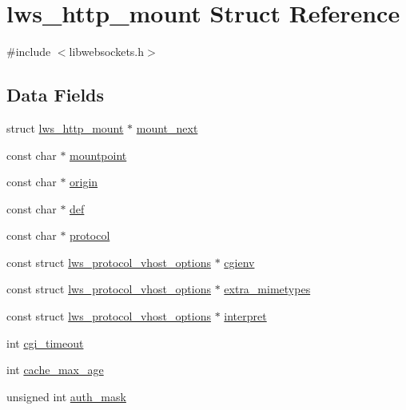 \hypertarget{structlws__http__mount}{}\section{lws\+\_\+http\+\_\+mount Struct Reference}
\label{structlws__http__mount}


{\ttfamily \#include $<$libwebsockets.\+h$>$}

\subsection*{Data Fields}
\begin{DoxyCompactItemize}
\item 
struct \hyperlink{structlws__http__mount}{lws\+\_\+http\+\_\+mount} $\ast$ \hyperlink{structlws__http__mount_ad878546ae1c399bbca7d7f8a0baf973d}{mount\+\_\+next}
\item 
const char $\ast$ \hyperlink{structlws__http__mount_aa2391bfcada0b7a290b3c6651f64586c}{mountpoint}
\item 
const char $\ast$ \hyperlink{structlws__http__mount_a21d86fd6043ec00e121ababbc29af39a}{origin}
\item 
const char $\ast$ \hyperlink{structlws__http__mount_ae90d1efe7178199fad39de2926902ee4}{def}
\item 
const char $\ast$ \hyperlink{structlws__http__mount_a05347d92c3d379809564bd4f3eab259b}{protocol}
\item 
const struct \hyperlink{structlws__protocol__vhost__options}{lws\+\_\+protocol\+\_\+vhost\+\_\+options} $\ast$ \hyperlink{structlws__http__mount_ae7b5c0f4c5408061e6ea3a8d281f45af}{cgienv}
\item 
const struct \hyperlink{structlws__protocol__vhost__options}{lws\+\_\+protocol\+\_\+vhost\+\_\+options} $\ast$ \hyperlink{structlws__http__mount_a4437423df85ee3dbcae0e15974c89ec7}{extra\+\_\+mimetypes}
\item 
const struct \hyperlink{structlws__protocol__vhost__options}{lws\+\_\+protocol\+\_\+vhost\+\_\+options} $\ast$ \hyperlink{structlws__http__mount_a11ea62b952710d59733dbcf9794a5773}{interpret}
\item 
int \hyperlink{structlws__http__mount_a4a7239d6d4c03986e6e1a72abb6c83aa}{cgi\+\_\+timeout}
\item 
int \hyperlink{structlws__http__mount_a4283e30ea89d27ae7d061ad760d1d146}{cache\+\_\+max\+\_\+age}
\item 
unsigned int \hyperlink{structlws__http__mount_a614364c770b0bd4db464ad65cddab477}{auth\+\_\+mask}

\end{DoxyCompactItemize}
